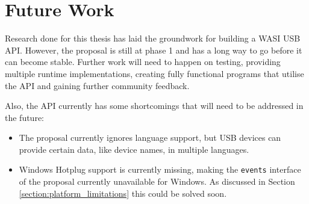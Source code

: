 \chapter{Future Work}
Research done for this thesis has laid the groundwork for building a \acrshort{WASI} \acrshort{USB} \acrshort{API}. However, the proposal is still at phase 1 and has a long way to go before it can become stable. Further work will need to happen on testing, providing multiple runtime implementations, creating fully functional programs that utilise the \acrshort{API} and gaining further community feedback.

Also, the \acrshort{API} currently has some shortcomings that will need to be addressed in the future:

\begin{itemize}
\item The proposal currently ignores language support, but \acrshort{USB} devices can provide certain data, like device names, in multiple languages.
\item Windows Hotplug support is currently missing, making the \texttt{events} interface of the proposal currently unavailable for Windows. As discussed in Section \ref{section:platform_limitations} this could be solved soon.
\end{itemize}